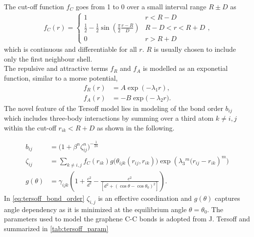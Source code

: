 The cut-off function $f_C$ goes from 1 to 0 over a small interval range $R \pm
D$ as
\begin{align*}
  f_C(r) =
  \begin{cases}
    1 & r < R - D \\
    \frac{1}{2} - \frac{1}{2} \sin{(\frac{\pi}{2} \frac{r - R}{D})} & R - D < r < R + D\\
    0 & r > R + D
  \end{cases},
\end{align*}
which is continuous and differentiable for all $r$. $R$ is usually chosen to
include only the first neighbour shell. \\
The repulsive and attractive terms $f_R$ and $f_A$ is modelled as an exponetial
function, similar to a morse potential, 
\begin{align*}
 f_R(r) &= A \exp(-\lambda_1 r), \\
 f_A(r) &= -B \exp \big(-\lambda_2 r\big).
\end{align*}
The novel feature of the Tersoff model lies in modeling of the bond order
$b_{ij}$ which includes three-body interactions by summing over a third atom $k
\ne i,j$ within the cut-off $r_{ik} < R + D$ as shown in the following.

\begin{align}
  b_{i j} & =\big(1+\beta^n \zeta_{i j}^n\big)^{-\frac{1}{2 n}} \\
  \zeta_{i j} & =\sum_{k \ne i,j} f_C(r_{i k}) g\Big(\theta_{i j k}\left(r_{i j}, r_{i k}\right)\Big) \exp \left(\lambda_3{ }^m\big(r_{i j}-r_{i k}\right)^m\big) \\
  g(\theta) & =\gamma_{i j k}\left(1+\frac{c^2}{d^2}-\frac{c^2}{\left[d^2+\left(\cos \theta-\cos \theta_0\right)^2\right]}\right).
  \label{eq:tersoff_bond_order}
\end{align}
In \cref{eq:tersoff_bond_order} $\zeta_{i,j}$ is an effective coordination and
$g(\theta)$ captures angle dependency as it is minimized at the equilibrium
angle $\theta = \theta_0$. The parameters used to model the graphene C-C bonds
is adopted from J. Tersoff \cite{PhysRevB.39.5566} and summarized in
\cref{tab:tersoff_param}



